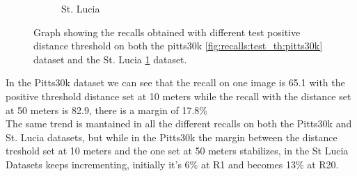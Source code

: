 \documentclass[10pt,twocolumn,letterpaper]{article}
\begin{document}
\begin{figure}[!h]
\begin{subfigure}[b]{0.23\textwidth}
			\caption{St. Lucia}
			\label{fig:recalls:test_th:st_lucia}
		\end{subfigure}
		\caption{Graph showing the recalls obtained with different test positive distance threshold on both the pitts30k \ref{fig:recalls:test_th:pitts30k} dataset and the St. Lucia \ref{fig:recalls:test_th:st_lucia} dataset.}
		\label{fig:recalls:test_th}
	\end{figure}
	In the Pitts30k dataset we can see that the recall on one image is 65.1 with the positive threshold distance set at 10 meters while the recall with the distance set at 50 meters is 82.9, there is a margin of 17.8\%\\
	The same trend is mantained in all the different recalls on both the Pitts30k and St. Lucia datasets, but while in the Pitts30k the margin between the distance treshold set at 10 meters and the one set at 50 meters stabilizes, in the St Lucia Datasets keeps incrementing, initially it's 6\% at R1 and becomes 13\% at R20.
	
\end{document}
